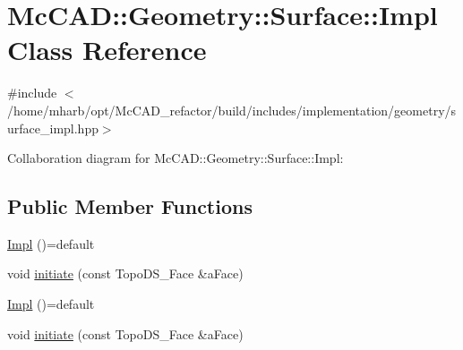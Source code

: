 \hypertarget{classMcCAD_1_1Geometry_1_1Surface_1_1Impl}{}\section{Mc\+C\+AD\+:\+:Geometry\+:\+:Surface\+:\+:Impl Class Reference}
\label{classMcCAD_1_1Geometry_1_1Surface_1_1Impl}


{\ttfamily \#include $<$/home/mharb/opt/\+Mc\+C\+A\+D\+\_\+refactor/build/includes/implementation/geometry/surface\+\_\+impl.\+hpp$>$}



Collaboration diagram for Mc\+C\+AD\+:\+:Geometry\+:\+:Surface\+:\+:Impl\+:
\subsection*{Public Member Functions}
\begin{DoxyCompactItemize}
\item 
\hyperlink{classMcCAD_1_1Geometry_1_1Surface_1_1Impl_ae1bfecf4b3158933b37d4f4df24133ab}{Impl} ()=default
\item 
void \hyperlink{classMcCAD_1_1Geometry_1_1Surface_1_1Impl_ac86d81ec667089a969dcb10b996d7233}{initiate} (const Topo\+D\+S\+\_\+\+Face \&a\+Face)
\item 
\hyperlink{classMcCAD_1_1Geometry_1_1Surface_1_1Impl_ae1bfecf4b3158933b37d4f4df24133ab}{Impl} ()=default
\item 
void \hyperlink{classMcCAD_1_1Geometry_1_1Surface_1_1Impl_ac86d81ec667089a969dcb10b996d7233}{initiate} (const Topo\+D\+S\+\_\+\+Face \&a\+Face)
\end{DoxyCompactItemize}
